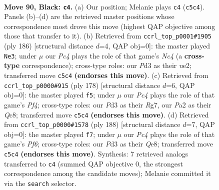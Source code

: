 \documentclass[11pt]{article}
\begin{document}
\clearpage

\begin{figure}[p]\centering
\begin{subfigure}{0.46\textwidth}\centering
\resizebox{\linewidth}{!}{%
\newchessgame
\chessboard[
  setfen={8/8/8/2p1k3/7K/3p4/p7/8 b - - 1 90},
  showmover=false,
  pgfstyle=straightmove, color=movearrow, markmove={c5-c4}
]}
\caption{}
\end{subfigure}\hfill
\begin{subfigure}{0.46\textwidth}\centering
\resizebox{\linewidth}{!}{%
\newchessgame
\chessboard[
  setfen={6k1/8/8/5K1P/2N5/7P/4n3/8 w - - 19 94},
  showmover=false,
  pgfstyle=straightmove, color=movearrow, markmove={c4-e3}
]}
\caption{}
\end{subfigure}
\\[4pt]
\begin{subfigure}{0.46\textwidth}\centering
\resizebox{\linewidth}{!}{%
\newchessgame
\chessboard[
  setfen={2Q5/6R1/8/8/k4P2/3K4/8/8 w - - 1 90},
  showmover=false,
  pgfstyle=straightmove, color=movearrow, markmove={f4-f5}
]}
\caption{}
\end{subfigure}\hfill
\begin{subfigure}{0.46\textwidth}\centering
\resizebox{\linewidth}{!}{%
\newchessgame
\chessboard[
  setfen={4Q3/8/5P2/3k4/8/6K1/8/8 w - - 0 95},
  showmover=false,
  pgfstyle=straightmove, color=movearrow, markmove={f6-f7}
]}
\caption{}
\end{subfigure}
\caption{\textbf{Move 90, Black: \texttt{c4}.} (a) Our position; Melanie plays \texttt{c4} (\texttt{c5c4}). Panels (b)--(d) are the retrieved master positions whose correspondence most drove this move (highest QAP objective among those that transfer to it). (b) Retrieved from \texttt{ccrl\_top\_p0001\#1905} (ply 186) [structural distance $d$=4, QAP obj=0]: the master played \texttt{Ne3}; under $\mu$ our \emph{Pc4} plays the role of that game's \emph{Nc4} (a \textbf{cross-type} correspondence); cross-type roles: our \emph{P}d3 as their \emph{n}e2; transferred move \texttt{c5c4} \textbf{(endorses this move)}. (c) Retrieved from \texttt{ccrl\_top\_p0000\#915} (ply 178) [structural distance $d$=6, QAP obj=0]: the master played \texttt{f5}; under $\mu$ our \emph{Pc4} plays the role of that game's \emph{Pf4}; cross-type roles: our \emph{P}d3 as their \emph{R}g7, our \emph{P}a2 as their \emph{Q}c8; transferred move \texttt{c5c4} \textbf{(endorses this move)}. (d) Retrieved from \texttt{ccrl\_top\_p0000\#1578} (ply 188) [structural distance $d$=7, QAP obj=0]: the master played \texttt{f7}; under $\mu$ our \emph{Pc4} plays the role of that game's \emph{Pf6}; cross-type roles: our \emph{P}d3 as their \emph{Q}e8; transferred move \texttt{c5c4} \textbf{(endorses this move)}. Synthesis: 7 retrieved analogs transferred to \texttt{c4} (summed QAP objective 0, the strongest correspondence among the candidate moves); Melanie committed it via the \texttt{search} selector.}
\label{fig:thought-m179}
\end{figure}
\end{document}
